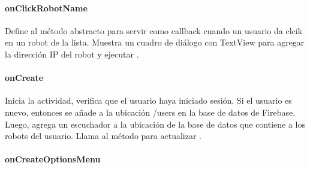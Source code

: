 \paragraph{onClickRobotName}
\label{\detokenize{dev_docs:onclickrobotname}}

\begin{fulllineitems}
\label{\detokenize{dev_docs:com.lar.cloudnao.SelectRobotActivity.onClickRobotName(String, String)}}
Define al método abstracto  para servir como callback cuando un usuario da clcik en un robot de la lista. Muestra un cuadro de diálogo con TextView para agregar la dirección IP del robot y ejecutar .

\end{fulllineitems}



\paragraph{onCreate}
\label{\detokenize{dev_docs:id4}}

\begin{fulllineitems}
\label{\detokenize{dev_docs:com.lar.cloudnao.SelectRobotActivity.onCreate(Bundle)}}
Inicia la actividad, verifica que el usuario haya iniciado sesión. Si el usuario es nuevo, entonces se añade a la ubicación /users en la base de datos de Firebase. Luego, agrega un escuchador a la ubicación de la base de datos que contiene a los robots del usuario. Llama al método  para actualizar {\hyperref[\detokenize{dev_docs:com.lar.cloudnao.SelectRobotActivity.robotListFromFirebaseRecyclerView}]{}}.

\end{fulllineitems}



\paragraph{onCreateOptionsMenu}
\label{\detokenize{dev_docs:oncreateoptionsmenu}}

